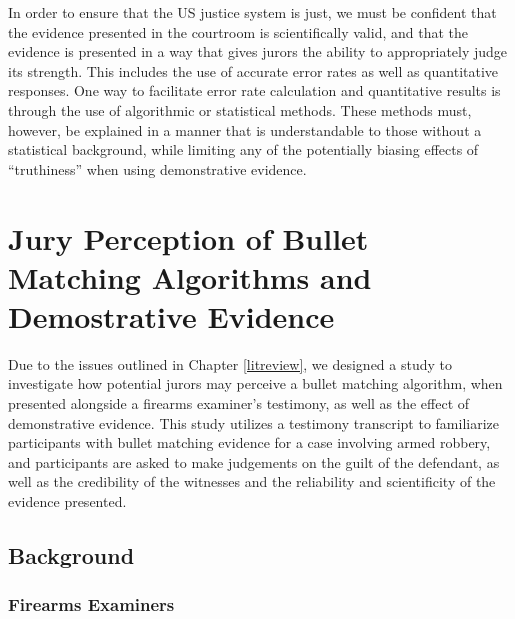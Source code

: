 \documentclass[print]{nuthesis}
\begin{document}
In order to ensure that the US justice system is just, we must be confident that the evidence presented in the courtroom is scientifically valid, and that the evidence is presented in a way that gives jurors the ability to appropriately judge its strength.
This includes the use of accurate error rates as well as quantitative responses.
One way to facilitate error rate calculation and quantitative results is through the use of algorithmic or statistical methods.
These methods must, however, be explained in a manner that is understandable to those without a statistical background, while limiting any of the potentially biasing effects of ``truthiness'' when using demonstrative evidence.

\hypertarget{study1}{%
\chapter{Jury Perception of Bullet Matching Algorithms and Demostrative Evidence}\label{study1}}

Due to the issues outlined in Chapter \ref{litreview}, we designed a study to investigate how potential jurors may perceive a bullet matching algorithm, when presented alongside a firearms examiner's testimony, as well as the effect of demonstrative evidence.
This study utilizes a testimony transcript to familiarize participants with bullet matching evidence for a case involving armed robbery, and participants are asked to make judgements on the guilt of the defendant, as well as the credibility of the witnesses and the reliability and scientificity of the evidence presented.

\hypertarget{background}{%
\section{Background}\label{background}}

\hypertarget{firearms-examiners}{%
\subsection{Firearms Examiners}\label{firearms-examiners}}
\end{document}
